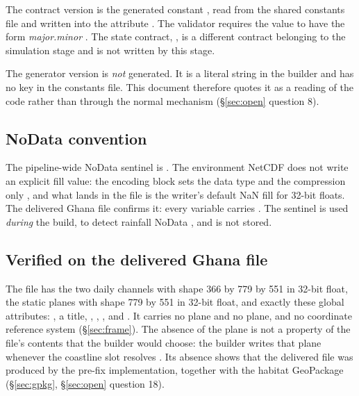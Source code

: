 \documentclass[11pt,a4paper]{article} \usepackage[utf8]{inputenc} \usepackage{lmodern} \usepackage[T1]{fontenc}
\begin{document}
The contract version is the generated constant , read from the shared
constants file  and written into the
attribute . The validator requires the value
to have the form \emph{major.minor} .
The state contract, , is a different contract belonging to the
simulation stage and is not written by this stage.

The generator version is \emph{not} generated. It is a literal string in the builder
 and has no key in the constants file. This
document therefore quotes it as a reading of the code rather than through the normal mechanism
(\S\ref{sec:open} question 8).

\subsection{NoData convention}

The pipeline-wide NoData sentinel is 
. The environment NetCDF does not write an
explicit fill value: the encoding block sets the data type and the compression only
, and what lands in the file is the
writer's default NaN fill for 32-bit floats. The delivered Ghana file confirms it: every
variable carries . The sentinel is used \emph{during} the build, to
detect rainfall NoData , and is not stored.

\subsection{Verified on the delivered Ghana file}

The file  has the two daily channels with
shape 366 by 779 by 551 in 32-bit float, the  static
planes with shape 779 by 551 in 32-bit float, and exactly these global attributes: , a title,
, , ,
 and . It
carries no  plane and no  plane, and no coordinate
reference system (\S\ref{sec:frame}). The absence of the  plane is not a
property of the file's contents that the builder would choose: the builder writes that plane
whenever the coastline slot resolves
. Its absence shows that the
delivered file was produced by the pre-fix implementation, together with the habitat
GeoPackage (\S\ref{sec:gpkg}, \S\ref{sec:open} question 18).
\end{document}

